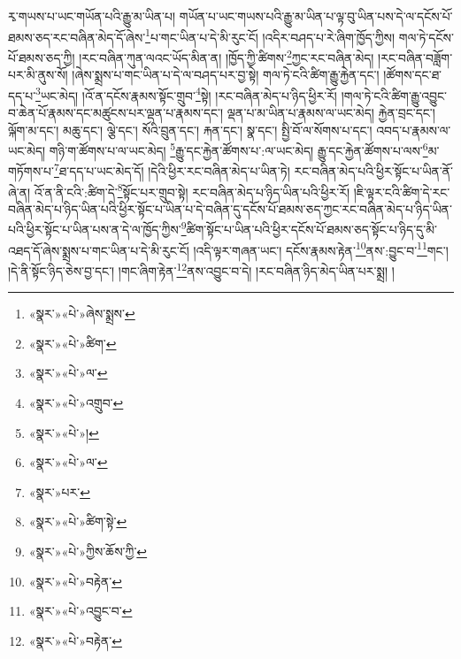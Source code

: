 རྭ་གཡས་པ་ཡང་གཡོན་པའི་རྒྱུ་མ་ཡིན་པ། གཡོན་པ་ཡང་གཡས་པའི་རྒྱུ་མ་ཡིན་པ་ལྟ་བུ་ཡིན་པས་དེ་ལ་དངོས་པོ་ཐམས་ཅད་རང་བཞིན་མེད་དོ་ཞེས་\footnote{«སྣར་»«པེ་»ཞེས་སྨྲས་}པ་གང་ཡིན་པ་དེ་མི་རུང་ངོ། །འདིར་བཤད་པ་རེ་ཞིག་ཁྱོད་ཀྱིས། གལ་ཏེ་དངོས་པོ་ཐམས་ཅད་ཀྱི། །རང་བཞིན་ཀུན་ལའང་ཡོད་མིན་ན། །ཁྱོད་ཀྱི་ཚིགས་\footnote{«སྣར་»«པེ་»ཚིག་}ཀྱང་རང་བཞིན་མེད། །རང་བཞིན་བཟློག་པར་མི་ནུས་སོ། །ཞེས་སྨྲས་པ་གང་ཡིན་པ་དེ་ལ་བཤད་པར་བྱ་སྟེ། གལ་ཏེ་ངའི་ཚིག་རྒྱུ་རྐྱེན་དང་། །ཚོགས་དང་ཐ་དད་པ་\footnote{«སྣར་»«པེ་»ལ་}ཡང་མེད། །འོ་ན་དངོས་རྣམས་སྟོང་གྲུབ་\footnote{«སྣར་»«པེ་»འགྲུབ་}སྟེ། །རང་བཞིན་མེད་པ་ཉིད་ཕྱིར་རོ། །གལ་ཏེ་ངའི་ཚིག་རྒྱུ་འབྱུང་བ་ཆེན་པོ་རྣམས་དང་མཚུངས་པར་ལྡན་པ་རྣམས་དང་། ལྡན་པ་མ་ཡིན་པ་རྣམས་ལ་ཡང་མེད། རྐྱེན་བྲང་དང་། ལྐོག་མ་དང་། མཆུ་དང་། ལྕེ་དང་། སོའི་བྲུན་དང་། རྐན་དང་། སྣ་དང་། སྤྱི་བོ་ལ་སོགས་པ་དང་། འབད་པ་རྣམས་ལ་ཡང་མེད། གཉི་ག་ཚོགས་པ་ལ་ཡང་མེད། \footnote{«སྣར་»«པེ་»།  }རྒྱུ་དང་རྐྱེན་ཚོགས་པ་:ལ་ཡང་མེད། རྒྱུ་དང་རྐྱེན་ཚོགས་པ་ལས་\footnote{«སྣར་»«པེ་»ལ་}མ་གཏོགས་པ་\footnote{«སྣར་»པར་}ཐ་དད་པ་ཡང་མེད་དོ། །དེའི་ཕྱིར་རང་བཞིན་མེད་པ་ཡིན་ཏེ། རང་བཞིན་མེད་པའི་ཕྱིར་སྟོང་པ་ཡིན་ནོ་ཞེ་ན། འོ་ན་ནི་ངའི་:ཚིག་དེ་\footnote{«སྣར་»«པེ་»ཚིག་སྟེ་}སྟོང་པར་གྲུབ་སྟེ། རང་བཞིན་མེད་པ་ཉིད་ཡིན་པའི་ཕྱིར་རོ། །ཇི་ལྟར་ངའི་ཚིག་དེ་རང་བཞིན་མེད་པ་ཉིད་ཡིན་པའི་ཕྱིར་སྟོང་པ་ཡིན་པ་དེ་བཞིན་དུ་དངོས་པོ་ཐམས་ཅད་ཀྱང་རང་བཞིན་མེད་པ་ཉིད་ཡིན་པའི་ཕྱིར་སྟོང་པ་ཡིན་པས་ན་དེ་ལ་ཁྱོད་ཀྱིས་\footnote{«སྣར་»«པེ་»ཀྱིས་ཆོས་ཀྱི་}ཚིག་སྟོང་པ་ཡིན་པའི་ཕྱིར་དངོས་པོ་ཐམས་ཅད་སྟོང་པ་ཉིད་དུ་མི་འཐད་དོ་ཞེས་སྨྲས་པ་གང་ཡིན་པ་དེ་མི་རུང་ངོ། །འདི་ལྟར་གཞན་ཡང་། དངོས་རྣམས་རྟེན་\footnote{«སྣར་»«པེ་»བརྟེན་}ནས་:བྱུང་བ་\footnote{«སྣར་»«པེ་»འབྱུང་བ་}གང་། །དེ་ནི་སྟོང་ཉིད་ཅེས་བྱ་དང་། །གང་ཞིག་རྟེན་\footnote{«སྣར་»«པེ་»བརྟེན་}ནས་འབྱུང་བ་དེ། །རང་བཞིན་ཉིད་མེད་ཡིན་པར་སྨྲ། །
